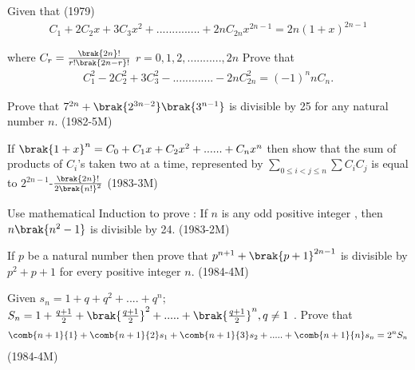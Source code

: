  \iffalse
\title{Assignment}
\author{Golla Shriram - AI24BTech11010}
\section{subjective}
\fi                                                                      
    
		
          \item Given that  \hfill{(1979)} 
			  \begin{align*}
C_1 + 2C_2x + 3C_3x^2 + .............. + 2nC_{2n}x^{2n-1}   =    2n(1+x)^{2n-1} 
			  \end{align*}
		
		where $C_r =\frac{\brak{2n}!}{r!\brak{2n-r}!}$ $r=0,1,2,...........,2n$     Prove that  \begin{align*} 
		     C^2_1-2C_2^2+3C_3^2-.............-2nC_{2n}^2  = (-1)^nnC_n. 
		     \end{align*}  

	   \item Prove that $ 7^{2n} + \brak{2^{3n-2}}  \brak{3^{n-1}} $ is divisible by 25 for any natural number $ n$. \hfill{(1982-5M)}  


           \item If $ \brak{1+x}^n= C_0 + C_1x +C_2x^2+......+C_nx^n $ then show that the sum of products of $ C_i $'s taken
		   two at a time, represented by $ \sum\limits_{0 \leq i<j \leq n}^{}\sum C_i C_j $ is equal to $ 2^{2n-1}$-$\frac{\brak{2n}!} {2\brak{n!}^2} $ \hfill{(1983-3M)}

	   \item Use mathematical Induction to prove : If $n$ is any odd positive integer , then  $ n\brak{n^2-1} $ is divisible by 24.
		   \hfill{(1983-2M)}


	   \item If $ p $ be a natural number then prove that $ p^{n+1}+\brak{p+1}^{2n-1} $ is divisible by $ p^2+p+1 $ for every positive integer $n$. \hfill{(1984-4M)} 

            \item Given  $ s_n = 1 + q + q^2 +....+q^n;$
		    $ S_n = 1 + \frac{q+1}{2}+\brak{\frac{q+1}{2}}^2+.....+\brak{\frac{q+1}{2}}^n,q\neq1 $ . Prove that
		     \begin{align*} 
			    \comb{n+1}{1}+\comb{n+1}{2}s_1+\comb{n+1}{3}s_2+.....+\comb{n+1}{n}s_n=2^nS_n
		    \end{align*}    \hfill{(1984-4M)}


